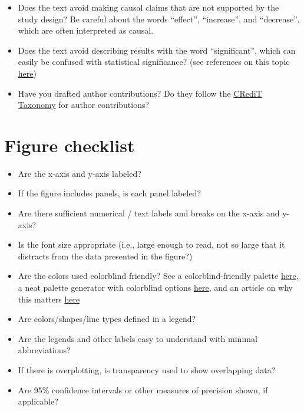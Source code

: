 \documentclass[
]{book}
\providecommand{\tightlist}{%
  \setlength{\itemsep}{0pt}\setlength{\parskip}{0pt}}
\begin{document}
\begin{itemize}
\item
  Does the text avoid making causal claims that are not supported by the study design? Be careful about the words ``effect'', ``increase'', and ``decrease'', which are often interpreted as causal.
\item
  Does the text avoid describing results with the word ``significant'', which can easily be confused with statistical significance? (see references on this topic \href{https://journals.lww.com/epidem/Fulltext/2001/05000/The_Value_of_P.2.aspx}{here})
\item
  Have you drafted author contributions? Do they follow the \href{https://journals.plos.org/plosone/s/authorship/?utm_source=plos&utm_medium=blog&utm_campaign=plos-1607-credit\#loc-author-contributions}{CRediT Taxonomy} for author contributions?
\end{itemize}

\section{Figure checklist}\label{figure-checklist}

\begin{itemize}
\tightlist
\item
  Are the x-axis and y-axis labeled?
\item
  If the figure includes panels, is each panel labeled?
\item
  Are there sufficient numerical / text labels and breaks on the x-axis and y-axis?
\item
  Is the font size appropriate (i.e., large enough to read, not so large that it distracts from the data presented in the figure?)
\item
  Are the colors used colorblind friendly? See a colorblind-friendly palette \href{http://www.cookbook-r.com/Graphs/Colors_(ggplot2)/\#a-colorblind-friendly-palette}{here}, a neat palette generator with colorblind options \href{https://medialab.github.io/iwanthue/?utm_source=Nature+Briefing&utm_campaign=2c68711076-briefing-dy-20211006&utm_medium=email&utm_term=0_c9dfd39373-2c68711076-44335685}{here}, and an article on why this matters \href{https://www.nature.com/articles/d41586-021-02696-z}{here}
\item
  Are colors/shapes/line types defined in a legend?
\item
  Are the legends and other labels easy to understand with minimal abbreviations?
\item
  If there is overplotting, is transparency used to show overlapping data?
\item
  Are 95\% confidence intervals or other measures of precision shown, if applicable?
\end{itemize}
\end{document}
